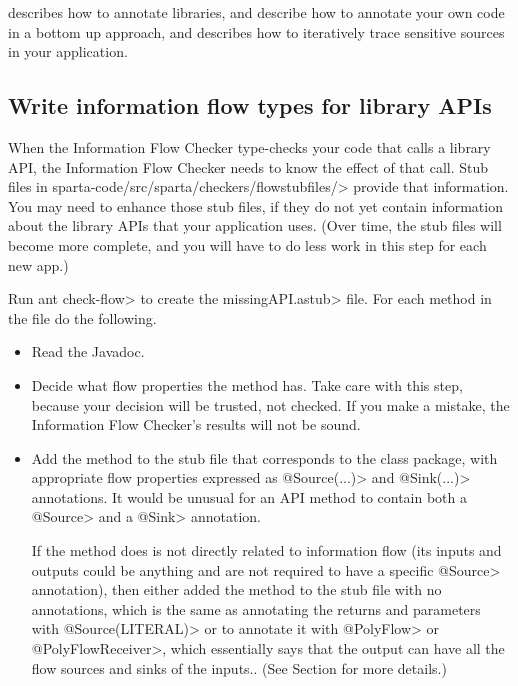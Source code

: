  describes how to annotate libraries,
 and  describe how to
annotate your own code in a bottom up approach, and  describes
how to iteratively trace sensitive sources in your application.


\subsection{Write information flow types for library APIs\label{flow-task-annotate-apis}}

When the Information Flow Checker type-checks your code that calls a library API, the
Information Flow Checker needs to know the effect of that call.  
Stub files in \<sparta-code/src/sparta/checkers/flowstubfiles/> provide
that information.  You may need to enhance those stub files, if they do not
yet contain information about the library APIs that your application uses.
(Over time, the stub files will become more complete, and you will have to
do less work in this step for each new app.)

Run \<ant check-flow> to create the \<missingAPI.astub> file. For each method in the 
file do the following.  
\begin{itemize}
\item
Read the Javadoc.
\item
Decide what flow properties the method has.  Take care with this step,
because your decision will be trusted, not checked.  If you make a mistake,
the Information Flow Checker's results will not be sound.
\item
Add the method to the stub file that corresponds to the class package, with
appropriate flow properties expressed as \<@Source(...)> and
\<@Sink(...)> annotations.
It would be unusual for an API method to contain both a \<@Source>
and a \<@Sink> annotation.

If the method does is not directly related to information flow (its inputs
and outputs could be anything and are not required to have a specific
\<@Source> annotation), then either added the method to the stub file with no 
annotations, which is the same as annotating the returns and parameters with
\<@Source(LITERAL)> or to annotate it with \<@PolyFlow> or \<@PolyFlowReceiver>, 
which essentially says that the
output can have all the flow sources and sinks of the inputs..
(See Section  for more details.)

\end{itemize}

